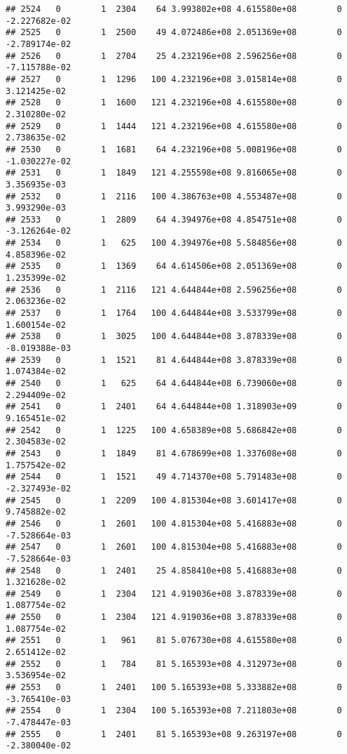 \documentclass[
]{article}
\begin{document}
\begin{enumerate}
\begin{verbatim}
## 2524   0        1  2304    64 3.993802e+08 4.615580e+08        0 -2.227682e-02
## 2525   0        1  2500    49 4.072486e+08 2.051369e+08        0 -2.789174e-02
## 2526   0        1  2704    25 4.232196e+08 2.596256e+08        0 -7.115788e-02
## 2527   0        1  1296   100 4.232196e+08 3.015814e+08        0  3.121425e-02
## 2528   0        1  1600   121 4.232196e+08 4.615580e+08        0  2.310280e-02
## 2529   0        1  1444   121 4.232196e+08 4.615580e+08        0  2.738635e-02
## 2530   0        1  1681    64 4.232196e+08 5.008196e+08        0 -1.030227e-02
## 2531   0        1  1849   121 4.255598e+08 9.816065e+08        0  3.356935e-03
## 2532   0        1  2116   100 4.386763e+08 4.553487e+08        0  3.993290e-03
## 2533   0        1  2809    64 4.394976e+08 4.854751e+08        0 -3.126264e-02
## 2534   0        1   625   100 4.394976e+08 5.584856e+08        0  4.858396e-02
## 2535   0        1  1369    64 4.614506e+08 2.051369e+08        0  1.235399e-02
## 2536   0        1  2116   121 4.644844e+08 2.596256e+08        0  2.063236e-02
## 2537   0        1  1764   100 4.644844e+08 3.533799e+08        0  1.600154e-02
## 2538   0        1  3025   100 4.644844e+08 3.878339e+08        0 -8.019388e-03
## 2539   0        1  1521    81 4.644844e+08 3.878339e+08        0  1.074384e-02
## 2540   0        1   625    64 4.644844e+08 6.739060e+08        0  2.294409e-02
## 2541   0        1  2401    64 4.644844e+08 1.318903e+09        0  9.165451e-02
## 2542   0        1  1225   100 4.658389e+08 5.686842e+08        0  2.304583e-02
## 2543   0        1  1849    81 4.678699e+08 1.337608e+08        0  1.757542e-02
## 2544   0        1  1521    49 4.714370e+08 5.791483e+08        0 -2.327493e-02
## 2545   0        1  2209   100 4.815304e+08 3.601417e+08        0  9.745882e-02
## 2546   0        1  2601   100 4.815304e+08 5.416883e+08        0 -7.528664e-03
## 2547   0        1  2601   100 4.815304e+08 5.416883e+08        0 -7.528664e-03
## 2548   0        1  2401    25 4.858410e+08 5.416883e+08        0  1.321628e-02
## 2549   0        1  2304   121 4.919036e+08 3.878339e+08        0  1.087754e-02
## 2550   0        1  2304   121 4.919036e+08 3.878339e+08        0  1.087754e-02
## 2551   0        1   961    81 5.076730e+08 4.615580e+08        0  2.651412e-02
## 2552   0        1   784    81 5.165393e+08 4.312973e+08        0  3.536954e-02
## 2553   0        1  2401   100 5.165393e+08 5.333882e+08        0 -3.765410e-03
## 2554   0        1  2304   100 5.165393e+08 7.211803e+08        0 -7.478447e-03
## 2555   0        1  2401    81 5.165393e+08 9.263197e+08        0 -2.380040e-02

\end{verbatim}
\end{enumerate}
\end{document}

